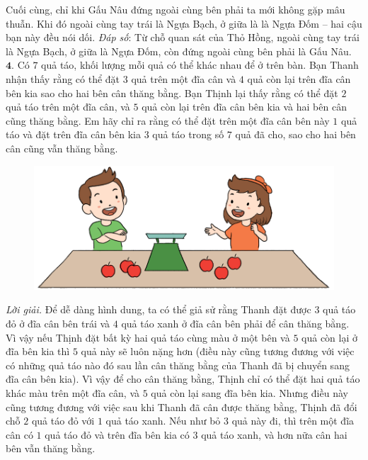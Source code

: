 \begin{multicols}{2}
\begin{figure}[H]
		\vspace*{-10pt}
	\end{figure}
	Cuối cùng, chỉ khi Gấu Nâu đứng ngoài cùng bên phải ta mới không gặp mâu thuẫn. Khi đó ngoài cùng tay trái là Ngựa Bạch, ở giữa là là Ngựa Đốm -- hai cậu bạn này đều nói dối.
	\vskip 0.1cm
	\textit{Đáp số}: Từ chỗ quan sát của Thỏ Hồng, ngoài cùng tay trái là Ngựa Bạch, ở giữa là Ngựa Đốm, còn đứng ngoài cùng bên phải là Gấu Nâu.
	\vskip 0.1cm
	$\pmb{4.}$ Có $7$ quả táo, khối lượng mỗi quả có thể khác nhau để ở trên bàn. Bạn Thanh nhận thấy rằng có thể đặt $3$ quả trên một đĩa cân và $4$ quả còn lại trên đĩa cân bên kia sao cho hai bên cân thăng bằng. Bạn Thịnh lại thấy rằng có thể đặt $2$ quả táo trên một đĩa cân, và $5$ quả còn lại trên đĩa cân bên kia và hai bên cân cũng thăng bằng. Em hãy chỉ ra rằng có thể đặt trên một đĩa cân bên này $1$ quả táo và đặt trên đĩa cân bên kia $3$ quả táo trong số $7$ quả đã cho, sao cho hai bên cân cũng vẫn thăng bằng.
	\begin{figure}[H]
		\centering
		\vspace*{-10pt}
		\captionsetup{labelformat= empty, justification=centering}
		\includegraphics[width=0.85\linewidth]{Pi9_bai4}
		\vspace*{-10pt}
	\end{figure}
	\textit{Lời giải.} 	Để dễ dàng hình dung, ta có thể giả sử rằng Thanh đặt được $3$ quả táo đỏ ở đĩa cân bên trái và $4$ quả táo xanh ở đĩa cân bên phải để cân thăng bằng. Vì vậy nếu Thịnh đặt bất kỳ hai quả táo cùng màu ở một bên và $5$ quả còn lại ở đĩa bên kia thì $5$ quả này sẽ luôn nặng hơn (điều này cũng tương đương với việc có những quả táo nào đó sau lần cân thăng bằng của Thanh đã bị chuyển sang đĩa cân bên kia).
	\vskip 0.1cm
	Vì vậy để cho cân thăng bằng, Thịnh chỉ có thể đặt hai quả táo khác màu trên một đĩa cân, và $5$ quả còn lại sang đĩa bên kia. Nhưng điều này cũng tương đương với việc sau khi Thanh đã cân được thăng bằng, Thịnh đã đổi chỗ $2$ quả táo đỏ với $1$ quả táo xanh. Nếu như bỏ $3$ quả này đi, thì trên một đĩa cân có $1$ quả táo đỏ và trên đĩa bên kia có $3$ quả táo xanh, và hơn nữa cân hai bên vẫn thăng bằng.

\end{multicols}

